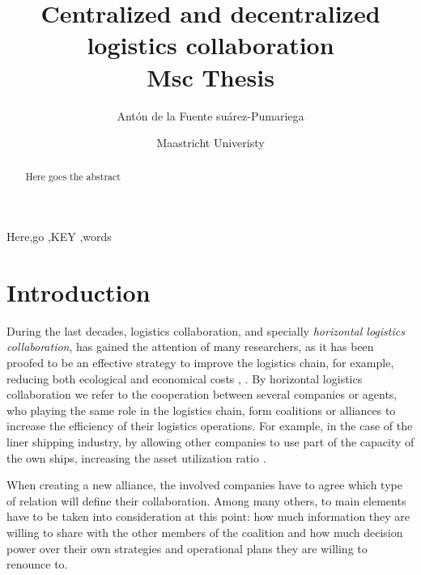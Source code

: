 \documentclass[authoryear]{elsarticle}
\begin{document}
\begin{frontmatter}

\title{Centralized and decentralized logistics collaboration \\[5pt]
                \normalsize{Msc Thesis}}

\author{Antón de la Fuente suárez-Pumariega}
\address{a.delafuentesuarez-pumariega@student.maastrichtuniverisry.nl }

\author{Maastricht Univeristy}



\begin{abstract}
Here goes the abstract
\end{abstract}

\begin{keyword}
Here\sep go \sep KEY \sep words
\end{keyword}

\end{frontmatter}


\section{Introduction}

During the last decades, logistics collaboration, and specially \emph{horizontal
logistics collaboration}, has gained the attention of many researchers, as it
has been proofed to be an effective strategy to improve the logistics chain, for
example, reducing both ecological and economical 
costs \citep{BALLOT2010}, \citep{SOYSAL2018168}. By horizontal logistics collaboration we refer to the
cooperation between several companies or agents, who playing the same role in
the logistics chain, form coalitions or alliances to increase the efficiency of
their logistics operations. For example, in the case of the liner shipping
industry, by allowing other companies to use part of the capacity of the own
ships, increasing the asset utilization ratio \citep{AGARWAL2008175}.

When creating a new alliance, the involved companies have to agree which type of relation will define their collaboration. Among many others, to main elements have to be taken into consideration at this point: how much information they are willing to share with the other members of the coalition and how much decision power over their own strategies and operational plans they are willing to renounce to.
\end{document}
